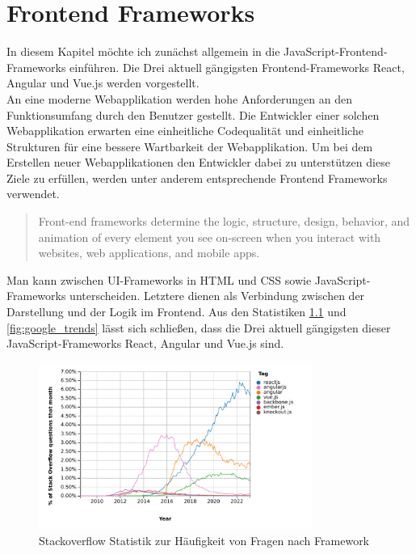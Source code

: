 %

\chapter{Frontend Frameworks}

In diesem Kapitel möchte ich zunächst allgemein in die JavaScript-Frontend-Frameworks einführen.
Die Drei aktuell gängigsten Frontend-Frameworks React, Angular und Vue.js werden vorgestellt.
\\
An eine moderne Webapplikation werden hohe Anforderungen an den Funktionsumfang durch den Benutzer gestellt.
Die Entwickler einer solchen Webapplikation erwarten eine einheitliche Codequalität und einheitliche Strukturen
für eine bessere Wartbarkeit der Webapplikation.
Um bei dem Erstellen neuer Webapplikationen den Entwickler dabei zu unterstützen diese Ziele zu erfüllen,
werden unter anderem entsprechende Frontend Frameworks verwendet.
\begin{quote}
    Front-end frameworks determine the logic, structure, design, behavior,
    and animation of every element you see on-screen when you interact with websites,
    web applications, and mobile apps. \cite{sigdestad22}
\end{quote}
Man kann zwischen UI-Frameworks in HTML und CSS sowie JavaScript-Frameworks unterscheiden.
Letztere dienen als Verbindung zwischen der Darstellung und der Logik im Frontend.
Aus den Statistiken \ref{fig:stackoverflow_stat} und \ref{fig:google_trends} lässt sich schließen,
dass die Drei aktuell gängigsten dieser JavaScript-Frameworks React, Angular und Vue.js sind.

\begin{figure}[!htb]
    \centering
    \includegraphics[width=0.8\textwidth]{img/js_frameworks_statistic_stackoverflow}
    \caption{Stackoverflow Statistik zur Häufigkeit von Fragen nach Framework \cite{stackoverflowStats}}
    \label{fig:stackoverflow_stat}
\end{figure}

